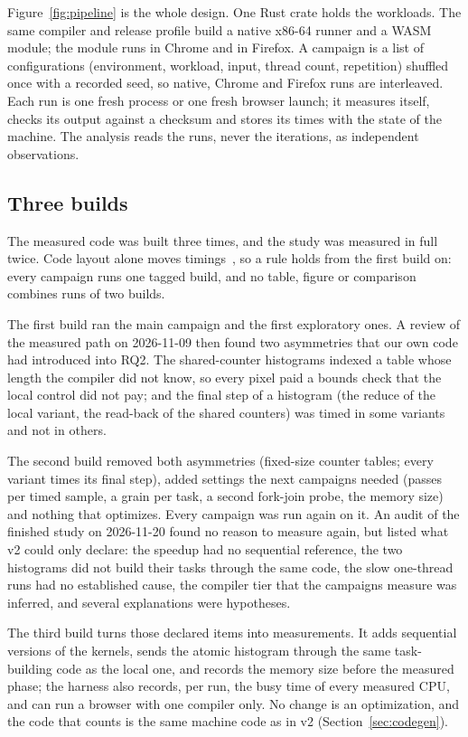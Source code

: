 Figure~\ref{fig:pipeline} is the whole design. One Rust crate holds the
workloads. The same compiler and release profile build a native x86-64
runner and a WASM module; the module runs in Chrome and in Firefox. A
campaign is a list of configurations (environment, workload, input, thread
count, repetition) shuffled once with a recorded seed, so native, Chrome and
Firefox runs are interleaved. Each run is one fresh process or one fresh
browser launch; it measures itself, checks its output against a checksum and
stores its times with the state of the machine. The analysis reads the runs,
never the iterations, as independent observations.

\subsection{Three builds}
\label{sec:builds-history}

The measured code was built three times, and the study was measured in full
twice. Code layout alone moves timings~\cite{mytkowicz2009}, so a rule holds
from the first build on: every campaign runs one tagged build, and no table,
figure or comparison combines runs of two builds.

\begin{description}[leftmargin=1.5em]
\item[v1.] The first build ran the main campaign and the first exploratory
ones. A review of the measured path on 2026-11-09 then found two asymmetries
that our own code had introduced into RQ2. The shared-counter histograms
indexed a table whose length the compiler did not know, so every pixel paid
a bounds check that the local control did not pay; and the final step of a
histogram (the reduce of the local variant, the read-back of the shared
counters) was timed in some variants and not in others.
\item[\code{measured/v2}.] The second build removed both asymmetries
(fixed-size counter tables; every variant times its final step), added
settings the next campaigns needed (passes per timed sample, a grain per
task, a second fork-join probe, the memory size) and nothing that optimizes.
Every campaign was run again on it. An audit of the finished study on
2026-11-20 found no reason to measure again, but listed what v2 could only
declare: the speedup had no sequential reference, the two histograms did not
build their tasks through the same code, the slow one-thread runs had no
established cause, the compiler tier that the campaigns measure was
inferred, and several explanations were hypotheses.
\item[\code{measured/v3}.] The third build turns those declared items into
measurements. It adds sequential versions of the kernels, sends the atomic
histogram through the same task-building code as the local one, and records
the memory size before the measured phase; the harness also records, per
run, the busy time of every measured CPU, and can run a browser with one
compiler only. No change is an optimization, and the code that counts is
the same machine code as in v2 (Section~\ref{sec:codegen}).
\end{description}

